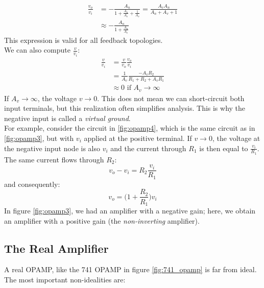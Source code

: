 \begin{equation}
	\begin{split}
		\frac{v_o}{v_i} &= -\frac{A_n}{1 + \frac{A_n}{A_v} + \frac{1}{A_v}} = \frac{A_v A_n}{A_n + A_v + 1} \\
						&\approx -\frac{A_n}{1+\frac{A_n}{A_v}} 
	\end{split}
	\label{eq:opamp_gain2}
\end{equation}
This expression is valid for all feedback topologies.\\
We can also compute $\frac{v}{v_i}$:
\begin{equation}
	\begin{split}
		\frac{v}{v_i} &= \frac{v}{v_o} \frac{v_o}{v_i} \\
					  &= \frac{1}{A_v} \frac{-A_v R_2}{R_1 + R_2 + A_v R_1} \\
					  &\approx 0  \text{ if } A_v \rightarrow \infty
	\end{split}
\end{equation}
If $A_v \rightarrow \infty$, the voltage $v \rightarrow 0$. This does not mean we can short-circuit both input terminals, but this realization often simplifies analysis. This is why the negative input is called a \emph{virtual ground}.\\
For example, consider the circuit in \ref{fig:opamp4}, which is the same circuit as in \ref{fig:opamp3}, but with $v_i$ applied at the positive terminal. If $v \rightarrow 0$, the voltage at the negative input node is also $v_i$ and the current through $R_1$ is then equal to $\frac{v_i}{R_1}$. The same current flows through $R_2$: 
$$v_o - v_i = R_2 \frac{v_i}{R_1}$$
and consequently:
$$v_o = \big(1 + \frac{R_2}{R_1} \big) v_i$$
In figure \ref{fig:opamp3}, we had an amplifier with a negative gain; here, we obtain an amplifier with a positive gain (the \emph{non-inverting} amplifier).

\subsection{The Real Amplifier}
A real OPAMP, like the 741 OPAMP in figure \ref{fig:741_opamp} is far from ideal. The most important non-idealities are:

